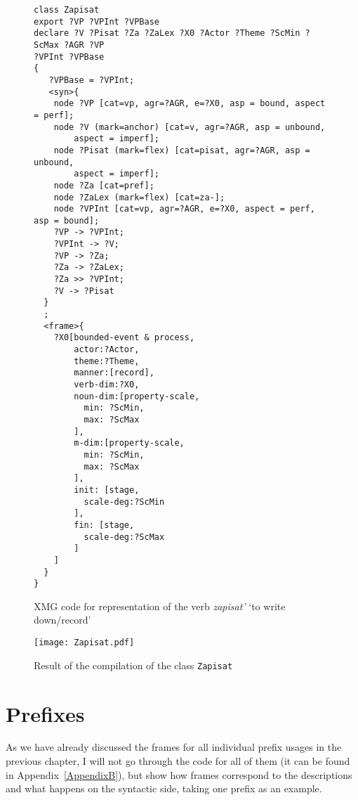  \begin{figure}
\begin{lstlisting}[style=xmg,basicstyle=\footnotesize\ttfamily]
class Zapisat
export ?VP ?VPInt ?VPBase
declare ?V ?Pisat ?Za ?ZaLex ?X0 ?Actor ?Theme ?ScMin ?ScMax ?AGR ?VP 
?VPInt ?VPBase
{
   ?VPBase = ?VPInt;
   <syn>{
    node ?VP [cat=vp, agr=?AGR, e=?X0, asp = bound, aspect = perf];
    node ?V (mark=anchor) [cat=v, agr=?AGR, asp = unbound, 
    	aspect = imperf];
    node ?Pisat (mark=flex) [cat=pisat, agr=?AGR, asp = unbound, 
    	aspect = imperf];
    node ?Za [cat=pref];
    node ?ZaLex (mark=flex) [cat=za-];
    node ?VPInt [cat=vp, agr=?AGR, e=?X0, aspect = perf, asp = bound];
    ?VP -> ?VPInt;
    ?VPInt -> ?V;
    ?VP -> ?Za;
    ?Za -> ?ZaLex;
    ?Za >> ?VPInt;
    ?V -> ?Pisat
  }
  ;
  <frame>{
    ?X0[bounded-event & process,
        actor:?Actor,
        theme:?Theme,
        manner:[record],
        verb-dim:?X0,
        noun-dim:[property-scale,
          min: ?ScMin,
          max: ?ScMax
        ],
        m-dim:[property-scale,
          min: ?ScMin,
          max: ?ScMax
        ],
        init: [stage, 
          scale-deg:?ScMin
        ],
        fin: [stage, 
          scale-deg:?ScMax
        ]
    ]
  }
}

\end{lstlisting}
\caption{XMG code for representation of the verb \textit{zapisat'} `to write down/record' \label{xmg:zapisat}}
\end{figure}

\begin{sidewaysfigure}
\texttt{[image: Zapisat.pdf]}
\caption{Result of the compilation of the class \texttt{Zapisat}\label{fig:zapisat}}
\end{sidewaysfigure}

\section{Prefixes}\largerpage[2]
As we have already discussed the frames for all individual prefix usages in the previous chapter, I will not go through the code for all of them (it can be found in Appendix~\ref{AppendixB}), but show how frames correspond to the  descriptions and what happens on the syntactic side, taking one prefix as an example.

